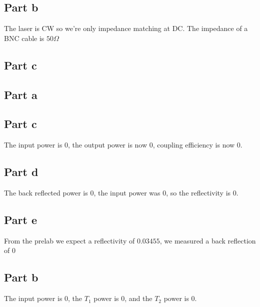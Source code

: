 
\subsection*{Part b}
The laser is CW so we're only impedance matching at DC. The impedance of a BNC cable is $50\Omega$


\subsection*{Part c}


\subsection*{Part a}

\subsection*{Part c}
The input power is $0$, the output power is now $0$, coupling efficiency is now $0$.


\subsection*{Part d}
The back reflected power is $0$, the input power was $0$, so the reflectivity is $0$.


\subsection*{Part e}
From the prelab we expect a reflectivity of $0.03455$, we measured a back reflection of $0$


\subsection*{Part b}
The input power is $0$, the $T_1$ power is $0$, and the $T_2$ power is $0$. 
